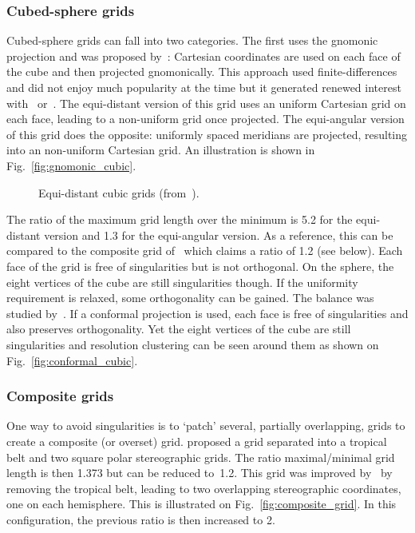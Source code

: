 \subsubsection{Cubed-sphere grids}
Cubed-sphere grids can fall into two categories. The first uses the
\gls{gnomonic} projection and was proposed by~\cite{Sadourny1972}: Cartesian
coordinates are used on each face of the cube and then projected gnomonically.
This approach used finite-differences and did not enjoy much popularity at the
time but it generated renewed interest with~\cite{Rancic1996}
or~\cite{Harris2011}.
The equi-distant version of this grid uses an uniform Cartesian grid on each
face, leading to a non-uniform grid once projected. The equi-angular version of
this grid does the opposite: uniformly spaced meridians are projected, resulting
into an non-uniform Cartesian grid. An illustration is shown in
Fig.~\ref{fig:gnomonic_cubic}.

\begin{figure}
  \hfill
  \caption{Equi-distant cubic grids (from~\cite{Putman2007}).}
\end{figure}

The ratio of the maximum grid length over the minimum is 5.2 for the
equi-distant version and 1.3 for the equi-angular version. As a reference, this
can be compared to the composite grid of~\cite{Phillips1962} which claims a
ratio of 1.2 (see below).  Each face of the grid is free of singularities but
is not orthogonal. On the sphere, the eight vertices of the cube are still
singularities though.  If the uniformity requirement is relaxed, some
orthogonality can be gained. The balance was studied by~\cite{Putman2007}.
If a \gls{conformal} projection is used, each face is free of singularities and
also preserves orthogonality. Yet the eight vertices of the cube are still
singularities and resolution clustering can be seen around them as shown on
Fig.~\ref{fig:conformal_cubic}.

\subsubsection{Composite grids}
 One way to avoid singularities is to `patch' several, partially overlapping,
grids to create a composite (or overset) grid.
\cite{Phillips1957} proposed a grid separated into a tropical belt and two
square polar \gls{stereographic} grids. The ratio maximal/minimal grid length is then
1.373 but can be reduced to~1.2. This grid was improved by~\cite{Browning1989}
by removing the tropical belt, leading to two overlapping \gls{stereographic}
coordinates, one on each hemisphere. This is illustrated on
Fig.~\ref{fig:composite_grid}.
In this configuration, the previous ratio is then increased to 2.

